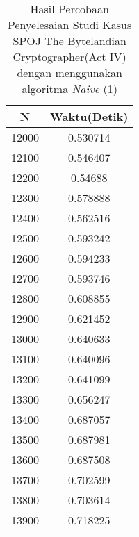 \begin{table}[H]
\centering
\caption {Hasil Percobaan Penyelesaian Studi Kasus SPOJ The Bytelandian Cryptographer(Act IV) dengan menggunakan algoritma \textit{Naive} (1)}
\begin{tabular}{|c|c|}\hline
N&Waktu(Detik)\\ \hline
12000&0.530714\\ \hline
12100&0.546407\\ \hline
12200&0.54688\\ \hline
12300&0.578888\\ \hline
12400&0.562516\\ \hline
12500&0.593242\\ \hline
12600&0.594233\\ \hline
12700&0.593746\\ \hline
12800&0.608855\\ \hline
12900&0.621452\\ \hline
13000&0.640633\\ \hline
13100&0.640096\\ \hline
13200&0.641099\\ \hline
13300&0.656247\\ \hline
13400&0.687057\\ \hline
13500&0.687981\\ \hline
13600&0.687508\\ \hline
13700&0.702599\\ \hline
13800&0.703614\\ \hline
13900&0.718225\\ \hline
\end{tabular}
\label{tab:res4}
\end{table}
